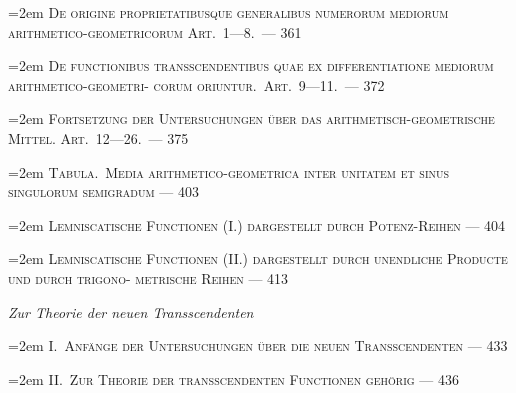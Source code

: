 \documentclass[12pt,a4paper]{article}
\begin{document}
\vspace{0.3em}
\noindent\hangindent=2em
\textsc{De origine proprietatibusque generalibus numerorum mediorum arithmetico-geometricorum\linebreak
\hspace*{\fill} Art.\ 1---8.\ \dotfill --- 361}

\vspace{0.3em}
\noindent\hangindent=2em
\textsc{De functionibus transscendentibus quae ex differentiatione mediorum arithmetico-geometri-\linebreak
\hspace*{\fill} corum oriuntur.\ Art.\ 9---11.\ \dotfill --- 372}

\vspace{0.3em}
\noindent\hangindent=2em
\textsc{Fortsetzung der Untersuchungen \"uber das arithmetisch-geometrische Mittel.\linebreak
\hspace*{\fill} Art.\ 12---26.\ \dotfill --- 375}

\vspace{0.3em}
\noindent\hangindent=2em
\textsc{Tabula.\ Media arithmetico-geometrica inter unitatem et sinus singulorum semigradum\linebreak
\hspace*{\fill} \dotfill --- 403}

\vspace{0.3em}
\noindent\hangindent=2em
\textsc{Lemniscatische Functionen (I.) dargestellt durch Potenz-Reihen \dotfill --- 404}

\vspace{0.3em}
\noindent\hangindent=2em
\textsc{Lemniscatische Functionen (II.) dargestellt durch unendliche Producte und durch trigono-\linebreak
\hspace*{\fill} metrische Reihen \dotfill --- 413}

\vspace{0.5em}
\noindent\textit{Zur Theorie der neuen Transscendenten}

\vspace{0.3em}
\noindent\hangindent=2em
I.\ \textsc{Anf\"ange der Untersuchungen \"uber die neuen Transscendenten \dotfill --- 433}

\vspace{0.3em}
\noindent\hangindent=2em
II.\ \textsc{Zur Theorie der transscendenten Functionen geh\"orig \dotfill --- 436}
\end{document}
